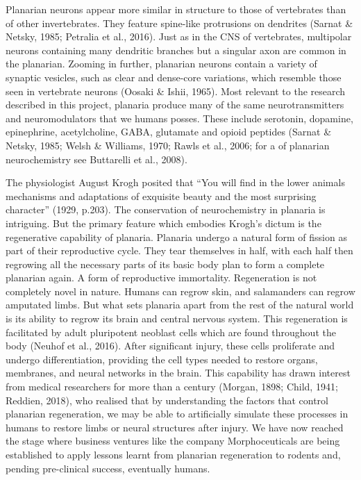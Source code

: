 \documentclass[
  letterpaper,
  DIV=11,
  numbers=noendperiod,
  oneside]{scrartcl}
\begin{document}
Planarian neurons appear more similar in structure to those of
vertebrates than of other invertebrates. They feature spine-like
protrusions on dendrites (Sarnat \& Netsky, 1985; Petralia et al.,
2016). Just as in the CNS of vertebrates, multipolar neurons containing
many dendritic branches but a singular axon are common in the planarian.
Zooming in further, planarian neurons contain a variety of synaptic
vesicles, such as clear and dense-core variations, which resemble those
seen in vertebrate neurons (Oosaki \& Ishii, 1965). Most relevant to the
research described in this project, planaria produce many of the same
neurotransmitters and neuromodulators that we humans posses. These
include serotonin, dopamine, epinephrine, acetylcholine, GABA, glutamate
and opioid peptides (Sarnat \& Netsky, 1985; Welsh \& Williams, 1970;
Rawls et al., 2006; for a of planarian neurochemistry see Buttarelli et
al., 2008).

The physiologist August Krogh posited that ``You will find in the lower
animals mechanisms and adaptations of exquisite beauty and the most
surprising character'' (1929, p.203). The conservation of neurochemistry
in planaria is intriguing. But the primary feature which embodies
Krogh's dictum is the regenerative capability of planaria. Planaria
undergo a natural form of fission as part of their reproductive cycle.
They tear themselves in half, with each half then regrowing all the
necessary parts of its basic body plan to form a complete planarian
again. A form of reproductive immortality. Regeneration is not
completely novel in nature. Humans can regrow skin, and salamanders can
regrow amputated limbs. But what sets planaria apart from the rest of
the natural world is its ability to regrow its brain and central nervous
system. This regeneration is facilitated by adult pluripotent neoblast
cells which are found throughout the body (Neuhof et al., 2016). After
significant injury, these cells proliferate and undergo differentiation,
providing the cell types needed to restore organs, membranes, and neural
networks in the brain. This capability has drawn interest from medical
researchers for more than a century (Morgan, 1898; Child, 1941; Reddien,
2018), who realised that by understanding the factors that control
planarian regeneration, we may be able to artificially simulate these
processes in humans to restore limbs or neural structures after injury.
We have now reached the stage where business ventures like the company
Morphoceuticals are being established to apply lessons learnt from
planarian regeneration to rodents and, pending pre-clinical success,
eventually humans.
\end{document}
